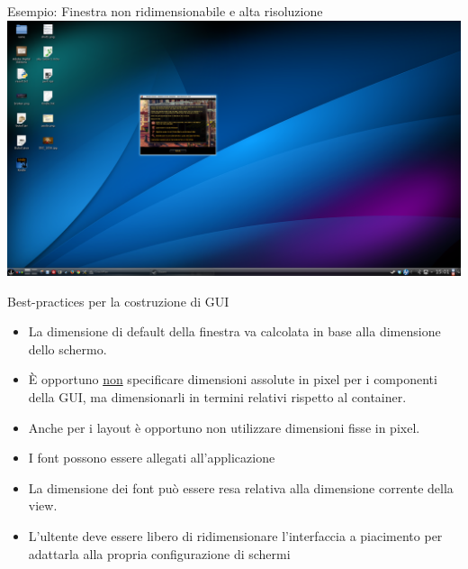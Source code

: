 \documentclass[presentation]{beamer}
\begin{document}
\begin{frame}{Esempio: Finestra non ridimensionabile e alta risoluzione}
\centering
\includegraphics[width=\textwidth]{img/brokensword}
\end{frame}

\begin{frame}{Best-practices per la costruzione di GUI}
\begin{itemize}\itemsep10pt
\item La dimensione di default della finestra va calcolata in base alla dimensione dello schermo.
\item \`{E} opportuno \underline{non} specificare dimensioni assolute in pixel per i componenti della GUI, ma dimensionarli in termini relativi rispetto al container.
\item Anche per i layout è opportuno non utilizzare dimensioni fisse in pixel.
\item I font possono essere allegati all'applicazione
\item La dimensione dei font può essere resa relativa alla dimensione corrente della view.
\item L'ultente deve essere libero di ridimensionare l'interfaccia a piacimento per adattarla alla 
propria configurazione di schermi
\end{itemize}
\end{frame}
\end{document}

